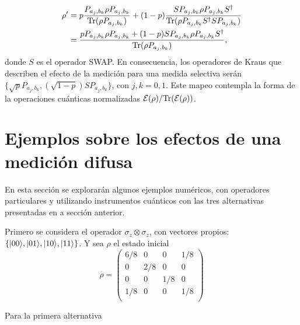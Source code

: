     \begin{equation}
       \begin{split}
           \rho'&= p\dfrac{ P_{a_j,b_k}\rho P_{a_j,b_k}}{{\rm Tr}(\rho P_{a_j,b_k})}+ (1-p)\dfrac{S P_{a_j,b_k}\rho P_{a_j,b_k}S^\dagger}{{\rm Tr}(\rho P_{a_j,b_k} S^\dagger SP_{a_j,b_k})}\\
           &=\dfrac{p P_{a_j,b_k}\rho P_{a_j,b_k}+(1-p) S P_{a_j,b_k}\rho P_{a_j,b_k}S^\dagger}{{\rm Tr}(\rho P_{a_j,b_k})},
       \end{split}
    \end{equation}
    donde $S$ es el operador SWAP\@. En consecuencia, los operadores de Kraus que describen el efecto de la medición para una medida selectiva serán $\{\sqrt{p}P_{a_j,b_k}, (\sqrt{1-p})S P_{a_j,b_k}\}$, con $j,k=0,1$. Este mapeo contempla la forma de la operaciones cuánticas normalizadas $\mathcal{E}(\rho)/{\rm Tr}(\mathcal{E}(\rho))$. %

    



\section{Ejemplos sobre los efectos de una medición difusa}

En esta sección se explorarán algunos ejemplos numéricos, con operadores particulares y utilizando instrumentos cuánticos con las tres alternativas presentadas en a sección anterior.

Primero se considera el operador $\sigma_z \otimes \sigma_z$, con vectores propios: $\{|00\rangle, |01\rangle, |10\rangle, |11\rangle\}$. Y sea $\rho $ el estado inicial
\[\rho={\begin{pmatrix}6/8&0&0 &1/8\\0&2/8&0 &0\\0 &0 &1/8 &0 \\1/8&0&0&1/8\\\end{pmatrix}}\]

Para la primera alternativa 

